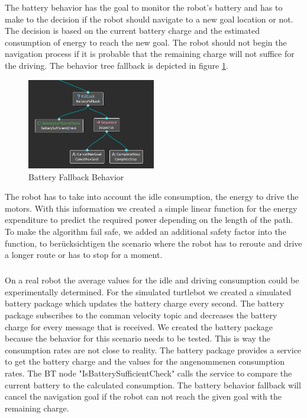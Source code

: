 The battery behavior has the goal to monitor the robot's battery and has to make to the decision if the robot should navigate to a new goal location or not. The decision is based on the current battery charge and the estimated consumption of energy to reach the new goal. The robot should not begin the navigation process if it is probable that the remaining charge will not suffice for the driving. The behavior tree fallback is depicted in figure \ref{fig:battery_fallback}.

\begin{center}
\begin{figure}[ht]
	\label{fig:battery_fallback}
	\includegraphics[width=0.5\textwidth]{images/battery_fallback.png}
	\caption{Battery Fallback Behavior}
\end{figure}
\end{center}

The robot has to take into account the idle consumption, the energy to drive the motors. With this information we created a simple linear function for the energy expenditure to predict the required power depending on the length of the path. To make the algorithm fail safe, we added an additional safety factor into the function, to berücksichtigen the scenario where the robot has to reroute and drive a longer route or has to stop for a moment. 
%
\subparagraph*{}

On a real robot the average values for the idle and driving consumption could be experimentally determined. For the simulated turtlebot we created a simulated battery package which updates the battery charge every second. The battery package subscribes to the comman velocity topic and decreases the battery charge for every message that is received. We created the battery package because the behavior for this scenario needs to be tested. This is way the consumption rates are not close to reality.
The battery package provides a service to get the battery charge and the values for the angenommenen consumption rates. The BT node "IsBatterySufficientCheck" calls the service to compare the current battery to the calculated consumption. The battery behavior fallback will cancel the navigation goal if the robot can not reach the given goal with the remaining charge.


